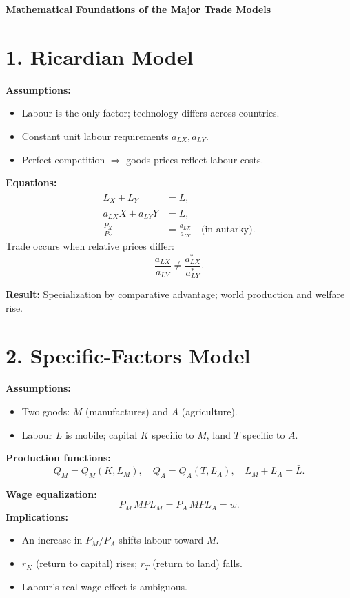 \documentclass[12pt]{article}
\begin{document}
\begin{center}
\Large \textbf{Mathematical Foundations of the Major Trade Models}
\end{center}

\vspace{0.8em}

\section*{1. Ricardian Model}

\textbf{Assumptions:}
\begin{itemize}
\item Labour is the only factor; technology differs across countries.
\item Constant unit labour requirements \( a_{LX}, a_{LY} \).
\item Perfect competition \(\Rightarrow\) goods prices reflect labour costs.
\end{itemize}

\textbf{Equations:}
\[
\begin{aligned}
L_X + L_Y &= \bar{L}, \\
a_{LX} X + a_{LY} Y &= \bar{L}, \\
\frac{P_X}{P_Y} &= \frac{a_{LX}}{a_{LY}} \quad \text{(in autarky)}.
\end{aligned}
\]
Trade occurs when relative prices differ:
\[
\frac{a_{LX}}{a_{LY}} \neq \frac{a_{LX}^*}{a_{LY}^*}.
\]

\textbf{Result:} Specialization by comparative advantage; world production and welfare rise.

\vspace{1em}

\section*{2. Specific-Factors Model}

\textbf{Assumptions:}
\begin{itemize}
\item Two goods: \( M \) (manufactures) and \( A \) (agriculture).
\item Labour \( L \) is mobile; capital \( K \) specific to \( M \), land \( T \) specific to \( A \).
\end{itemize}

\textbf{Production functions:}
\[
Q_M = Q_M(K, L_M), \quad Q_A = Q_A(T, L_A), \quad L_M + L_A = \bar{L}.
\]

\textbf{Wage equalization:}
\[
P_M \, MPL_M = P_A \, MPL_A = w.
\]
\textbf{Implications:}
\begin{itemize}
\item An increase in \( P_M/P_A \) shifts labour toward \( M \).
\item \( r_K \) (return to capital) rises; \( r_T \) (return to land) falls.
\item Labour's real wage effect is ambiguous.
\end{itemize}
\end{document}
